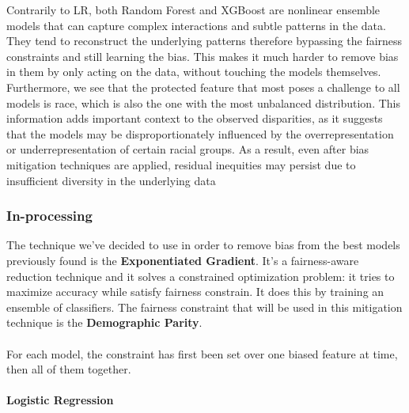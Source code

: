 \documentclass{article}
\begin{document}
Contrarily to LR, both Random Forest and XGBoost are nonlinear ensemble models that can capture complex interactions and subtle patterns in the data. They tend to reconstruct the underlying patterns therefore bypassing the fairness constraints and still learning the bias. This makes it much harder to remove bias in them by only acting on the data, without touching the models themselves. Furthermore, we see that the protected feature that most poses a challenge to all models is race, which is also the one with the most unbalanced distribution. This information adds important context to the observed disparities, as it suggests that the models may be disproportionately influenced by the overrepresentation or underrepresentation of certain racial groups. As a result, even after bias mitigation techniques are applied, residual inequities may persist due to insufficient diversity in the underlying data



\subsubsection{In-processing}
The technique we've decided to use in order to remove bias from the best models previously found is the \textbf{Exponentiated Gradient}. It's a fairness-aware reduction technique and it solves a constrained optimization problem: it tries to maximize accuracy while satisfy fairness constrain. It does this by training an ensemble of classifiers. The fairness constraint that will be used in this mitigation technique is the \textbf{Demographic Parity}.\\ \\
For each model, the constraint has first been set over one biased feature at time, then all of them together.
\paragraph{Logistic Regression}\mbox{}\\
\end{document}
